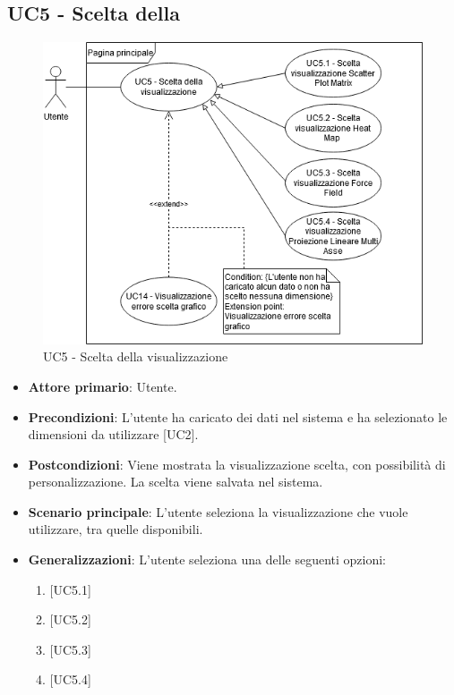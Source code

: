 \subsection{UC5 - Scelta della }
\begin{figure}[h]
\includegraphics[width=\linewidth]{section/Images/UC5.png}
\centering
\caption{UC5 - Scelta della visualizzazione}
\end{figure}
\begin{itemize}
	\item \textbf{Attore primario}: Utente.
	\item \textbf{Precondizioni}: L'utente ha caricato dei dati nel sistema e ha selezionato le dimensioni da utilizzare [UC2].
	\item \textbf{Postcondizioni}: Viene mostrata la visualizzazione scelta, con possibilità di personalizzazione. La scelta viene salvata nel sistema.
	\item \textbf{Scenario principale}: L'utente seleziona la visualizzazione che vuole utilizzare, tra quelle disponibili.
	\item \textbf{Generalizzazioni}: L'utente seleziona una delle seguenti opzioni:
		\begin{enumerate}
			\item {}
			\item {}
			\item {}
			\item {}
		\end{enumerate}

\end{itemize}